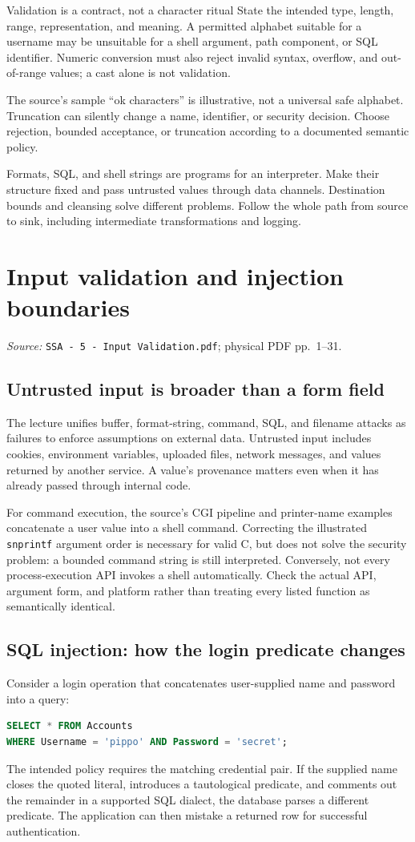 \documentclass[11pt,a4paper]{article}
\newcommand{\currentmodule}{Contents}
\newcommand{\source}[2]{\textcolor{muted}{\small\textit{Source:} \nolinkurl{#1}; physical PDF pp.~#2.}\par\medskip}
\newcommand{\module}[2]{\par\Needspace{8\baselineskip}\gdef\currentmodule{#1}\section{#1}\label{#2}}
\numberwithin{figure}{section}
\begin{document}
\begin{concept}{Validation is a contract, not a character ritual}
State the intended type, length, range, representation, and meaning. A permitted alphabet suitable for a username may be unsuitable for a shell argument, path component, or SQL identifier. Numeric conversion must also reject invalid syntax, overflow, and out-of-range values; a cast alone is not validation.
\end{concept}

The source's sample ``ok characters'' is illustrative, not a universal safe alphabet. Truncation can silently change a name, identifier, or security decision. Choose rejection, bounded acceptance, or truncation according to a documented semantic policy.

\begin{takeaway}
Formats, SQL, and shell strings are programs for an interpreter. Make their structure fixed and pass untrusted values through data channels. Destination bounds and cleansing solve different problems. Follow the whole path from source to sink, including intermediate transformations and logging.
\end{takeaway}

\module{Input validation and injection boundaries}{sec:validation}
\source{SSA - 5 - Input Validation.pdf}{1--31}
\subsection{Untrusted input is broader than a form field}
The lecture unifies buffer, format-string, command, SQL, and filename attacks as failures to enforce assumptions on external data. Untrusted input includes cookies, environment variables, uploaded files, network messages, and values returned by another service. A value's provenance matters even when it has already passed through internal code.

For command execution, the source's CGI pipeline and printer-name examples concatenate a user value into a shell command. Correcting the illustrated \texttt{snprintf} argument order is necessary for valid C, but does not solve the security problem: a bounded command string is still interpreted. Conversely, not every process-execution API invokes a shell automatically. Check the actual API, argument form, and platform rather than treating every listed function as semantically identical.

\subsection{SQL injection: how the login predicate changes}
Consider a login operation that concatenates user-supplied name and password into a query:
\begin{lstlisting}[language=SQL]
SELECT * FROM Accounts
WHERE Username = 'pippo' AND Password = 'secret';
\end{lstlisting}
The intended policy requires the matching credential pair. If the supplied name closes the quoted literal, introduces a tautological predicate, and comments out the remainder in a supported SQL dialect, the database parses a different predicate. The application can then mistake a returned row for successful authentication.
\end{document}
